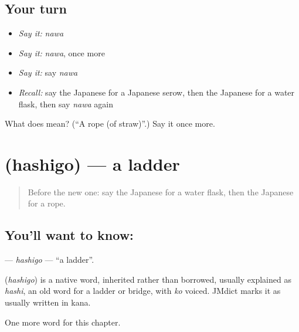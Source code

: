 \subsection*{Your turn}
\begin{itemize}
\raggedright
  \item \emph{Say it:} \emph{nawa}
  \item \emph{Say it:} \emph{nawa}, once more
  \item \emph{Say it:} say \emph{nawa}
  \item \emph{Recall:} say the Japanese for a Japanese serow, then the Japanese for a water flask, then say \emph{nawa} again
\end{itemize}

\begin{tcolorbox}[breakable,colback=teal!4,colframe=teal!35!black,title={Before you move on}]
What does  mean? (\textquotedblleft{}A rope (of straw)\textquotedblright{}.) Say it once more.
\end{tcolorbox}
\section[\texorpdfstring{\ja{はしご} (hashigo)}{はしご (hashigo)}]{ (hashigo) — a ladder}

\label{lesson:JA-C118-hashigo}



\begin{quote}
Before the new one: say the Japanese for a water flask, then the Japanese for a rope.
\end{quote}

\subsection*{You'll want to know: }
\textbf{} — \emph{hashigo} — \textquotedblleft{}a ladder\textquotedblright{}.

\begin{cousinweb}
\textbf{} (\emph{hashigo}) is a native word, inherited rather than borrowed, usually explained as \emph{hashi}, an old word for a ladder or bridge, with \emph{ko} voiced. JMdict marks it as usually written in kana.
\end{cousinweb}

\begin{grammarlens}[title={What you've built}]
One more word for this chapter.
\end{grammarlens}

